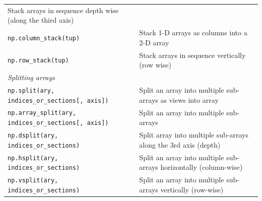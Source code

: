 \documentclass[a4paper,11pt]{book}
\begin{document}
\begin{appendices}
\begin{table}
\begin{tabular}{p{7.5cm}p{13cm}}
                Stack arrays in sequence depth wise (along the third axis)\\
                \texttt{np.column\_stack(tup)} &
                Stack 1-D arrays as columns into a 2-D array\\
                \texttt{np.row\_stack(tup)} &
                Stack arrays in sequence vertically (row wise)\\
		\midrule
		\multicolumn{1}{l}{\textit{Splitting arrays}} \\
		\midrule
                \texttt{np.split(ary, indices\_or\_sections[, axis])}&
		Split an array into multiple sub-arrays as views into array\\
                \texttt{np.array\_split(ary, indices\_or\_sections[, axis])}&
                Split an array into multiple sub-arrays\\
                \texttt{np.dsplit(ary, indices\_or\_sections)}&
                Split array into multiple sub-arrays along the 3rd axis (depth)\\
                \texttt{np.hsplit(ary, indices\_or\_sections)}&
                Split an array into multiple sub-arrays horizontally (column-wise)\\
                \texttt{np.vsplit(ary, indices\_or\_sections)}&
                Split an array into multiple sub-arrays vertically (row-wise)\\
		\midrule
	\end{tabular}
\end{table}
\clearpage


\end{appendices}
\end{document}

